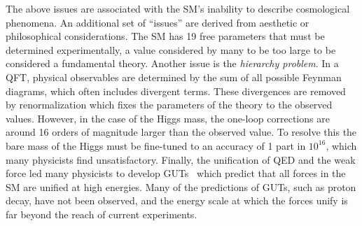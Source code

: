 The above issues are associated with the \Gls{SM}'s inability to describe cosmological phenomena.
An additional set of ``issues'' are derived from aesthetic or philosophical considerations.
The \Gls{SM} has 19 free parameters that must be determined experimentally, a value considered by many to be too large to be considered a fundamental theory.
Another issue is the \textit{hierarchy problem}.
In a \Gls{QFT}, physical observables are determined by the sum of all possible Feynman diagrams, which often includes divergent terms.
These divergences are removed by renormalization which fixes the parameters of the theory to the observed values.
However, in the case of the Higgs mass, the one-loop corrections are around 16 orders of magnitude larger than the observed value.
To resolve this the bare mass of the Higgs must be fine-tuned to an accuracy of 1 part in $10^{16}$, which many physicists find unsatisfactory.
Finally, the unification of \Gls{QED} and the weak force led many physicists to develop \Gls{GUTs}~\cite{GUT1, GUT2} which predict that all forces in the \Gls{SM} are unified at high energies.
Many of the predictions of \Gls{GUTs}, such as proton decay, have not been observed, and the energy scale at which the forces unify is far beyond the reach of current experiments.

